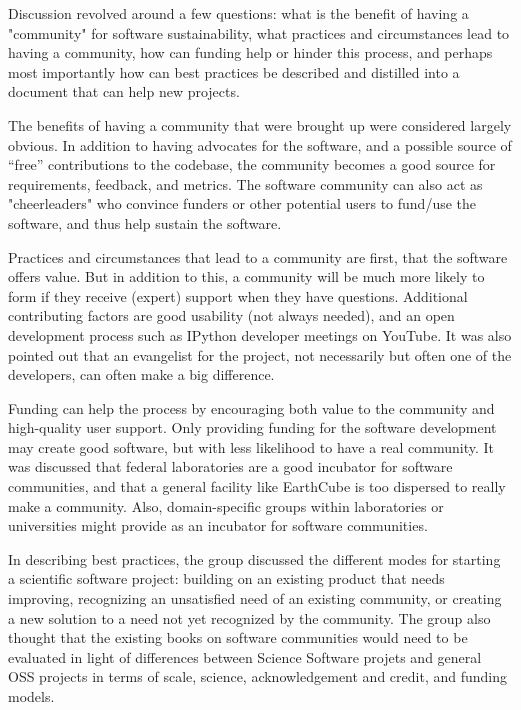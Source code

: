 Discussion revolved around a few questions: what is the benefit of having a "community" for software sustainability, what
practices and circumstances lead to having a community, how can funding help or hinder this process, and perhaps most
importantly how can best practices be described and distilled into a document that can help new projects.

The benefits of having a community that were brought up were considered largely obvious. In addition to having advocates for
the software, and a possible source of ``free'' contributions to the codebase, the community becomes a good source for
requirements, feedback, and metrics. The software community can also act as "cheerleaders" who convince funders or other
potential users to fund/use the software, and thus help sustain the software.

Practices and circumstances that lead to a community are first, that the software offers value. But in addition to this, a
community will be much more likely to form if they receive (expert) support when they have questions. Additional contributing
factors are good usability (not always needed), and an open development process such as IPython developer meetings on YouTube.
It was also pointed out that an evangelist for the project, not necessarily but often one of the developers, can often make a
big difference. 

Funding can help the process by encouraging both value to the community and high-quality user support. Only providing funding
for the software development may create good software, but with less likelihood to have a real community. It was discussed
that federal laboratories are a good incubator for software communities, and that a general facility like EarthCube is too
dispersed to really make a community. Also, domain-specific groups within laboratories or universities might provide as an
incubator for software communities.

In describing best practices, the group discussed the different modes for starting a scientific software project: building on
an existing product that needs improving, recognizing an unsatisfied need of an existing community, or creating a new solution
to a need not yet recognized by the community. The group also thought that the existing books on software communities would
need to be evaluated in light of differences between Science Software projets and general OSS projects in terms of scale,
science, acknowledgement and credit, and funding models.

